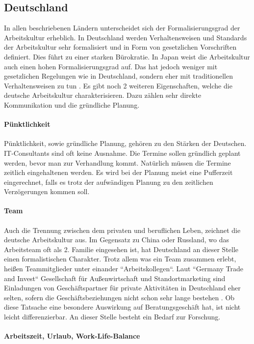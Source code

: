 	\subsection*{Deutschland}
	In allen beschriebenen Ländern unterscheidet sich der Formalisierungsgrad der Arbeitskultur erheblich. In Deutschland werden Verhaltensweisen und Standards der Arbeitskultur sehr formalisiert und in Form von gesetzlichen Vorschriften definiert. Dies führt zu einer starken Bürokratie. In Japan weist die Arbeitskultur auch einen hohen Formalisierungsgrad auf. Das hat jedoch weniger mit gesetzlichen Regelungen wie in Deutschland, sondern eher mit traditionellen Verhaltensweisen zu tun \cite[236]{3LaenderVergl}. Es gibt noch 2 weiteren Eigenschaften, welche die deutsche Arbeitskultur charakterisieren. Dazu zählen sehr direkte Kommunikation und die gründliche Planung.\\ \\
	\textbf{Pünktlichkeit}\\ \\
	Pünktlichkeit, sowie gründliche Planung, gehören zu den Stärken der Deutschen. IT-Consultants sind oft keine Ausnahme. Die Termine sollen gründlich geplant werden, bevor man zur Verhandlung kommt. Natürlich müssen die Termine zeitlich eingehaltenen werden. Es wird bei der Planung meist eine Pufferzeit eingerechnet, falls es trotz der aufwändigen Planung zu den zeitlichen Verzögerungen kommen soll.\\ \\
	\textbf{Team} \\ \\
		Auch die  Trennung zwischen dem privaten und beruflichen Leben, zeichnet die  deutsche Arbeitskultur aus. Im Gegensatz zu China oder Russland, wo das Arbeitsteam oft als 2. Familie eingesehen ist, hat Deutschland an dieser Stelle einen formalistischen Charakter. Trotz allem was ein Team zusammen erlebt, heißen Teammitglieder unter einander ``Arbeitskollegen``. Laut ``Germany Trade and Invest``
		Gesellschaft für Außenwirtschaft und Standortmarketing sind Einladungen  von Geschäftspartner für private Aktivitäten in Deutschland eher selten, sofern die  Geschäftsbeziehungen nicht schon sehr lange bestehen \cite{ArbKulturDE}. Ob diese Tatsache eine besondere Auswirkung auf Beratungsgeschäft hat, ist nicht leicht differenzierbar. An dieser Stelle besteht ein Bedarf zur Forschung. \\ \\
	\textbf{Arbeitszeit, Urlaub, Work-Life-Balance } \\ \\
